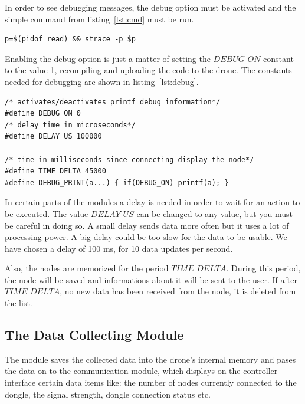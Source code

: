 In order to see debugging messages, the debug option must be activated and the simple command from listing~\ref{lst:cmd} must be run.

\begin{lstlisting}
p=$(pidof read) && strace -p $p
\end{lstlisting}

Enabling the debug option is just a matter of setting the $DEBUG\_ON$ constant to the value 1, recompiling and uploading the code to the drone. The constants needed for debugging are shown in listing~\ref{lst:debug}.

\lstset{numbers=none, mathescape=true, nolol=false,caption=Debug and timing defines,label=lst:debug}
\begin{lstlisting}
/* activates/deactivates printf debug information*/
#define DEBUG_ON 0
/* delay time in microseconds*/
#define DELAY_US 100000

/* time in milliseconds since connecting display the node*/
#define TIME_DELTA 45000
#define DEBUG_PRINT(a...) { if(DEBUG_ON) printf(a); }
\end{lstlisting}

In certain parts of the modules a delay is needed in order to wait for an action to be executed. The value $DELAY\_US$ can be changed to any value, but you must be careful in doing so. A small delay sends data more often but it uses a lot of processing power. A big delay could be too slow for the data to be usable. We have chosen a delay of 100 ms, for 10 data updates per second.

Also, the nodes are memorized for the period $TIME\_DELTA$. During this period, the node will be saved and informations about it will be sent to the user. If after $TIME\_DELTA$, no new data has been received from the node, it is deleted from the list.

\subsection{The Data Collecting Module}

The module saves the collected data into the drone's internal memory and pases the data on to the communication module, which displays on the controller interface certain data items like: the number of nodes currently connected to the dongle, the signal strength, dongle connection status etc.

